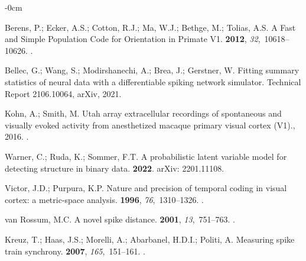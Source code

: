 \documentclass[brainsci, %
               review,submit,pdftex,moreauthors
               ]{Definitions/mdpi}
\begin{document}
\begin{adjustwidth}{-\extralength}{0cm}
\begin{thebibliography}{999}
  Berens, P.; Ecker, A.S.; Cotton, R.J.; Ma, W.J.; Bethge, M.; Tolias, A.S.
  \newblock A {Fast} and {Simple} {Population} {Code} for {Orientation} in
    {Primate} {V1}.
   {\bf 2012}, {\em 32},~10618--10626.
  .
  
  Bellec, G.; Wang, S.; Modirshanechi, A.; Brea, J.; Gerstner, W.
  \newblock Fitting summary statistics of neural data with a differentiable
    spiking network simulator.
  \newblock Technical Report 2106.10064, arXiv,  2021.
  
  Kohn, A.; Smith, M.
  \newblock Utah array extracellular recordings of spontaneous and visually
    evoked activity from anesthetized macaque primary visual cortex ({V1}).,
    2016.
  .
  
  Warner, C.; Ruda, K.; Sommer, F.T.
  \newblock A probabilistic latent variable model for detecting structure in
    binary data.
   {\bf 2022}.
  \newblock arXiv: 2201.11108.
  
  Victor, J.D.; Purpura, K.P.
  \newblock Nature and precision of temporal coding in visual cortex: a
    metric-space analysis.
   {\bf 1996}, {\em 76},~1310--1326.
  .
  
  van Rossum, M.C.
  \newblock A novel spike distance.
   {\bf 2001}, {\em 13},~751--763.
  .
  
  Kreuz, T.; Haas, J.S.; Morelli, A.; Abarbanel, H.D.I.; Politi, A.
  \newblock Measuring spike train synchrony.
   {\bf 2007}, {\em
    165},~151--161.
  .
  

\end{thebibliography}
\end{adjustwidth}
\end{document}
